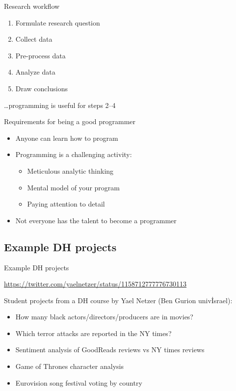 \documentclass[aspectratio=169,usenames,dvipsnames]{beamer}
\begin{document}
\begin{frame}{Research workflow}
    \begin{enumerate}
        \item Formulate research question
        \item Collect data
        \item Pre-process data
        \item Analyze data
        \item Draw conclusions
    \end{enumerate}

    \pause
    \dots programming is useful for steps 2--4
\end{frame}

\begin{frame}{Requirements for being a good programmer}
    \begin{itemize}
        \item Anyone can learn how to program
        \item Programming is a challenging activity:
            \begin{itemize}
                \item Meticulous analytic thinking
                \item Mental model of your program
                \item Paying attention to detail
            \end{itemize}
        \item Not everyone has the talent to become
            a  programmer
    \end{itemize}
\end{frame}



\subsection{Example DH projects}
\begin{frame}{Example DH projects}
\begin{reference}
\url{https://twitter.com/yaelnetzer/status/1158712777776730113}
\end{reference}
    Student projects from a DH course by Yael Netzer (Ben Gurion univ\. Israel):
    \begin{itemize}
        \item How many black actors/directors/producers are in movies?
        \item Which terror attacks are reported in the NY times?
        \item Sentiment analysis of GoodReads reviews vs NY times reviews
        \item Game of Thrones character analysis
        \item Eurovision song festival voting by country
    \end{itemize}
\end{frame}
\end{document}
